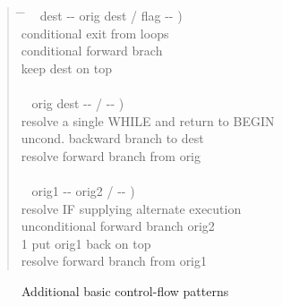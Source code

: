 \begin{quote}\ttfamily
  \begin{tabbing}
	\tab \= \hspace{10em} \= \kill
	\+ \word{:} ~  dest -{}- orig dest / flag -{}- ) \\
		 conditional exit from loops \\
		 		\>  conditional forward brach \\
	 			\>  keep dest on top \\
	\word{;}  \\[2\parskip]

	\+	\word{:} ~  orig dest -{}- / -{}- ) \\
		 resolve a single WHILE and return to BEGIN \\
		 	\>  uncond. backward branch to dest \\
	\-	 		\>  resolve forward branch from orig \\
	\word{;}  \\[2\parskip]

	\+ \word{:} ~  orig1 -{}- orig2 / -{}- ) \\
		 resolve IF supplying alternate execution \\
		 	\>  unconditional forward branch orig2 \\
		1 				\>  put orig1 back on top \\
	\-	 			\>  resolve forward branch from orig1 \\
	\word{;} 
  \end{tabbing}
\end{quote}

\begin{figure}[ht]
  \begin{center}
	\caption{Additional basic control-flow patterns}
	\label{fig:additional}
  \end{center}
\end{figure}

